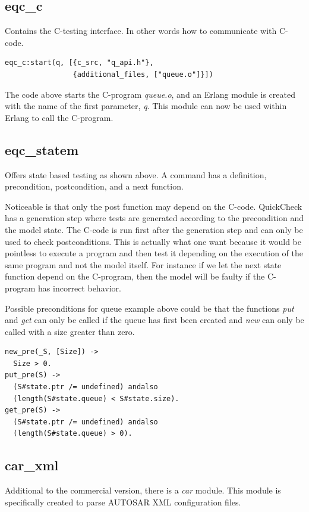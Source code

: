 \subsection{eqc\_c} Contains the C-testing interface. In other words how to
communicate with C-code.

\begin{lstlisting}
eqc_c:start(q, [{c_src, "q_api.h"},
                {additional_files, ["queue.o"]}])
\end{lstlisting}
The code above starts the C-program \emph{queue.o}, and an Erlang module is
created with the name of the first parameter, \emph{q}. This module can now
be used within Erlang to call the C-program.

\subsection{eqc\_statem}
\label{SEC:EQC_STATEM}
Offers state based testing as shown above. A command has a definition, precondition,
postcondition, and a next function.

Noticeable is that only the post function may depend on the
C-code. QuickCheck has a generation step where tests are generated
according to the precondition and the model state. The C-code is run
first after the generation step and can only be used to check
postconditions. This is actually what one want because it would be
pointless to execute a program and then test it depending on the
execution of the same program and not the model itself. For instance
if we let the next state function depend on the C-program, then the
model will be faulty if the C-program has incorrect behavior.

Possible preconditions for queue example above could be that the
functions \emph{put} and \emph{get} can only be called if
the queue has first been created and \emph{new} can only be
called with a size greater than zero.
\begin{lstlisting}
new_pre(_S, [Size]) ->
  Size > 0.
put_pre(S) ->
  (S#state.ptr /= undefined) andalso
  (length(S#state.queue) < S#state.size).
get_pre(S) ->
  (S#state.ptr /= undefined) andalso
  (length(S#state.queue) > 0).
\end{lstlisting}

\subsection{car\_xml}
Additional to the commercial version, there is a \emph{car} module. This module is
specifically created to parse AUTOSAR XML configuration files.

